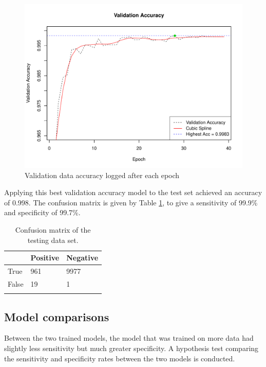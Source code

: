 \begin{figure}[ht]
	\centering
	\includegraphics[width=\textwidth]{Images/7_valid_acc5.pdf}
	\caption{Validation data accuracy logged after each epoch}
	\label{results-valid-acc5-fig}
\end{figure}

Applying this best validation accuracy model to the test set achieved an accuracy of 0.998. The confusion matrix is given by Table \ref{results-confmat5-tab}, to give a sensitivity of 99.9\% and specificity of 99.7\%.

\begin{table}[ht]
	\centering
	\begin{tabular}{@{}lll@{}}
	\toprule[1.5pt]
	& Positive & Negative\\
	\midrule
	True & 961 & 9977\\
	False & 19 & 1\\
	\bottomrule[1.5pt]\\
	\end{tabular}
	\caption{Confusion matrix of the testing data set.}
	\label{results-confmat5-tab}
\end{table}

\subsection*{Model comparisons}

Between the two trained models, the model that was trained on more data had slightly less sensitivity but much greater specificity. A hypothesis test comparing the sensitivity and specificity rates between the two models is conducted.


